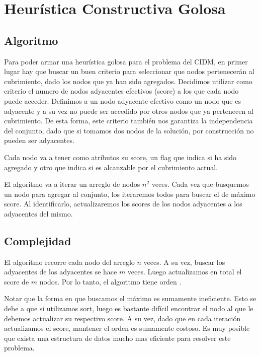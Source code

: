 \section{Heurística Constructiva Golosa}

\subsection{Algoritmo}

Para poder armar una heurística golosa para el problema del CIDM, en primer lugar hay que buscar un buen criterio para seleccionar que nodos pertenecerán al cubrimiento, dado los nodos que ya han sido agregados. Decidimos utilizar como criterio el numero de nodos adyacentes efectivos (score) a los que cada nodo puede acceder. Definimos a un nodo adyacente efectivo como un nodo que es adyacente y a su vez no puede ser accedido por otros nodos que ya pertenecen al cubrimiento. De esta forma, este criterio también nos garantiza la independencia del conjunto, dado que si tomamos dos nodos de la solución, por construcción no pueden ser adyacentes.

Cada nodo va a tener como atributos su score, un flag que indica si ha sido agregado y otro que indica si es alcanzable por el cubrimiento actual.

El algoritmo va a iterar un arreglo de nodos $n^2$ veces. Cada vez que busquemos un nodo para agregar al conjunto, los iteraremos todos para buscar el de máximo score. Al identificarlo, actualizaremos los scores de los nodos adyacentes a los adyacentes del mismo.

\subsection{Complejidad}

El algoritmo recorre cada nodo del arreglo $n$ veces. A su vez, buscar los adyacentes de los adyacentes se hace $m$ veces. Luego actualizamos en total el score de $m$ nodos. Por lo tanto, el algoritmo tiene orden .

Notar que la forma en que buscamos el máximo es sumamente ineficiente. Esto se debe a que si utilizamos sort, luego es bastante difícil encontrar el nodo al que le debemos actualizar su respectivo score. A su vez, dado que en cada iteración actualizamos el score, mantener el orden es sumamente costoso. Es muy posible que exista una estructura de datos mucho mas eficiente para resolver este problema.

